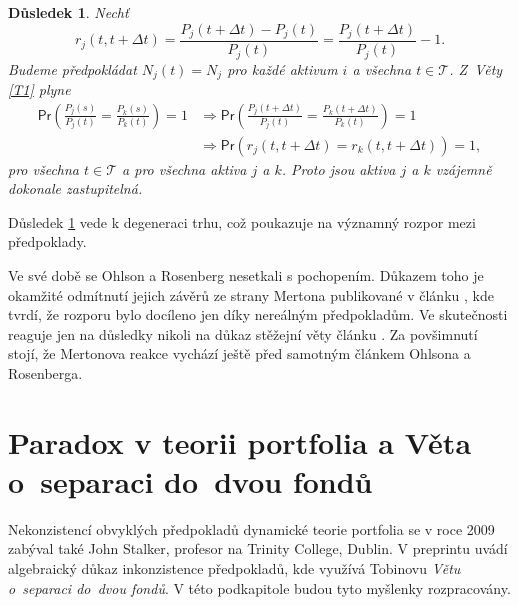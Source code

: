 \documentclass[a4paper,12pt]{report}
\newtheorem{dusledek}[veta]{Důsledek}
\theoremstyle{definition} \newtheorem{definice}[veta]{Definice}
\theoremstyle{remark}
\begin{document}
\begin{dusledek}\label{OR_dusledek}
Nechť 
$$r_j(t,t+\Delta t)=\frac{P_j(t+\Delta t)-P_j(t)}{P_j(t)}=\frac{P_j(t+\Delta t)}{P_j(t)}-1.$$
Budeme předpokládat $N_j(t)=N_j$ pro každé aktivum $i$ a všechna $t\in \mathcal{T}$. 
Z~Věty \ref{T1} plyne
\begin{align*}
\mathsf{Pr}\left(\frac{P_j(s)}{P_j(t)}=\frac{P_k(s)}{P_k(t)}\right)=1&\Longrightarrow\mathsf{Pr}\left(\frac{P_j(t+\Delta t)}{P_j(t)}=\frac{P_k(t+\Delta t)}{P_k(t)}\right)=1 \\
&\Longrightarrow\mathsf{Pr}\left(r_j(t,t+\Delta t)=r_k(t,t+\Delta t)\right)=1,
\end{align*}
pro všechna $t\in \mathcal{T}$ a pro všechna aktiva $j$ a $k$.
Proto jsou aktiva $j$ a $k$ vzájemně dokonale zastupitelná.
\end{dusledek}
Důsledek \ref{OR_dusledek} vede k degeneraci trhu, což poukazuje na významný rozpor mezi předpoklady.

Ve své době se Ohlson a Rosenberg nesetkali s pochopením.
Důkazem toho je okamžité odmítnutí jejich závěrů ze strany Mertona publikované v článku \cite{merton1975}, kde tvrdí, že rozporu bylo docíleno jen díky nereálným předpokladům. 
Ve skutečnosti reaguje jen na důsledky nikoli na důkaz stěžejní věty článku \cite{ohlson}.  
Za povšimnutí stojí, že Mertonova reakce vychází ještě před samotným článkem Ohlsona a Rosenberga.



\section{Paradox v teorii portfolia a Věta o~separaci do~dvou fondů} \label{john}
Nekonzistencí obvyklých předpokladů dynamické teorie portfolia se v roce 2009 zabýval také John Stalker, profesor na Trinity College, Dublin. 
V preprintu \cite{john} uvádí algebraický důkaz inkonzistence předpokladů, kde využívá Tobinovu \textit{Větu o~separaci do~dvou fondů}. 
V této podkapitole budou tyto myšlenky rozpracovány.
\end{document}
